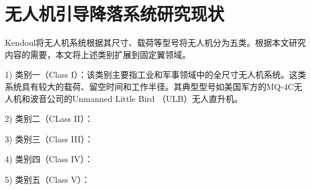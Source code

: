 \chapter{无人机引导降落系统研究现状}

 
Kendoul\cite{kendoul2012survey}将无人机系统根据其尺寸、载荷等型号将无人机分为五类。根据本文研究内容的需要，本文将上述类别扩展到固定翼领域。

1) 类别一（Class I）：该类别主要指工业和军事领域中的全尺寸无人机系统。这类系统具有较大的载荷、留空时间和工作半径。其典型型号如美国军方的MQ-4C无人机和波音公司的Unmanned Little Bird （ULB）无人直升机。

2) 类别二（CLass II）：

3) 类别三（Class III）：

4) 类别四（Class IV）：

5) 类别五（Class V）：

